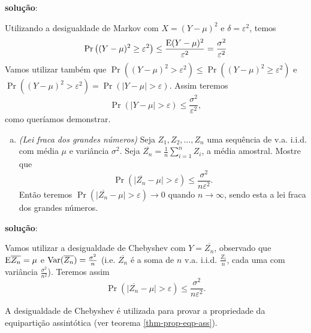 \begin{frame}[allowframebreaks]
\begin{exercise}
  \textbf{solução}:

  Utilizando a desigualdade de Markov com $X = (Y - \mu)^2$ e $\delta = \varepsilon^2$, temos
  \begin{equation}
  \Pr \left( (Y-\mu)^2 \geq \varepsilon^2 \right) \leq \frac{\mathrm{E} (Y-\mu)^2}{\varepsilon^2} = \frac{\sigma^2}{\varepsilon^2}
  \end{equation}
  Vamos utilizar também que $\Pr \left( (Y-\mu)^2 > \varepsilon^2 \right) \leq \Pr \left( (Y-\mu)^2 \geq \varepsilon^2 \right)$
  e $\Pr \left( (Y-\mu)^2 > \varepsilon^2 \right) = \Pr \left( \vert Y - \mu \vert > \varepsilon \right)$. Assim teremos
  \begin{equation}
  \Pr \left( \vert Y - \mu \vert > \varepsilon \right) \leq \frac{\sigma^2}{\varepsilon^2} ,
  \end{equation}
  como queríamos demonstrar.

  \exercisebreak
  \begin{enumerate}[c)]
  \item \emph{(Lei fraca dos grandes números)}
  Seja $Z_1, Z_2, \ldots, Z_n$ uma sequência de v.a. i.i.d. com média $\mu$ e variância $\sigma^2$.
  Seja $\overline{Z_n} = \frac{1}{n} \sum_{i=1}^{n} Z_i$, a média amostral. Mostre que
  \begin{equation}
  \Pr \left( \vert \overline{Z_n} - \mu \vert > \varepsilon \right) \leq \frac{\sigma^2}{n \varepsilon^2} .
  \end{equation}
  Então teremos $\Pr \left( \vert \overline{Z_n} - \mu \vert > \varepsilon \right) \rightarrow 0$ quando 
  $n \rightarrow \infty$, sendo esta a lei fraca dos grandes números.
  \end{enumerate}

  \exercisebreak

  \textbf{solução}:

  Vamos utilizar a desigualdade de Chebyshev com $Y = \overline{Z_n}$, observado que 
  $\mathrm{E} \overline{Z_n} = \mu$ e $\mathrm{Var} (\overline{Z_n}) = \frac{\sigma^2}{n}$
  (i.e. $\overline{Z_n}$ é a soma de $n$ v.a. i.i.d. $\frac{Z_i}{n}$, cada uma com 
  variância $\frac{\sigma^2}{n^2}$). Teremos assim
  \begin{equation}
  \Pr \left( \vert \overline{Z_n} - \mu \vert > \varepsilon  \right) \leq \frac{\sigma^2}{n \varepsilon^2} .
  \end{equation}

  A desigualdade de Chebyshev é utilizada para provar a propriedade da equipartição assintótica (ver teorema \ref{thm-prop-eqp-ass}).
  \end{exercise}
\end{frame}


